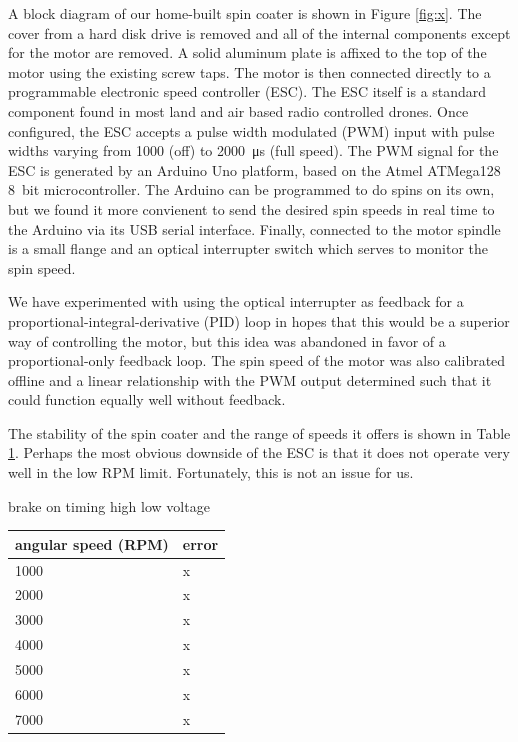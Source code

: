 \documentclass[a4paper,titlepage,onecolumn]{report}
\newcommand{\Figure}[1]{Figure \ref{#1}}
\newcommand{\Table}[1]{Table \ref{#1}}
\begin{document}
A block diagram of our home-built spin coater is shown in \Figure{fig:x}.
The cover from a hard disk drive is removed and all of the internal
components except for the motor are removed.  A solid aluminum plate is
affixed to the top of the motor using the existing screw taps.  The motor
is then connected directly to a programmable electronic speed controller
(ESC).  The ESC itself is a standard component found in most land and air
based radio controlled drones.  Once configured, the ESC accepts a pulse
width modulated (PWM) input with pulse widths varying from \num{1000} (off)
to \SI{2000}{\micro\second} (full speed).  The PWM signal for the ESC is
generated by an Arduino Uno platform, based on the Atmel ATMega128
\SI{8}{bit} microcontroller.  The Arduino can be programmed to do spins on
its own, but we found it more convienent to send the desired spin speeds in
real time to the Arduino via its USB serial interface.  Finally, connected
to the motor spindle is a small flange and an optical interrupter switch
which serves to monitor the spin speed.  

We have experimented with using the optical interrupter as feedback for a
proportional-integral-derivative (PID) loop in hopes that this would be a
superior way of controlling the motor, but this idea was abandoned in favor
of a proportional-only feedback loop.  The spin speed of the motor was also
calibrated offline and a linear relationship with the PWM output determined
such that it could function equally well without feedback.  

The stability of the spin coater and the range of speeds it offers is shown
in \Table{tbl:spincoatererror}.  Perhaps the most obvious downside of the
ESC is that it does not operate very well in the low RPM limit.
Fortunately, this is not an issue for us.

brake on
timing  high
low voltage

\begin{table}
 \begin{tabular}{ll}
  \toprule
  angular speed (RPM) & error \\
  \midrule
  1000 & x \\
  2000 & x \\
  3000 & x \\
  4000 & x \\
  5000 & x \\
  6000 & x \\
  7000 & x \\
  \bottomrule
 \end{tabular}
 \label{tbl:spincoatererror}
\end{table}
\end{document}
